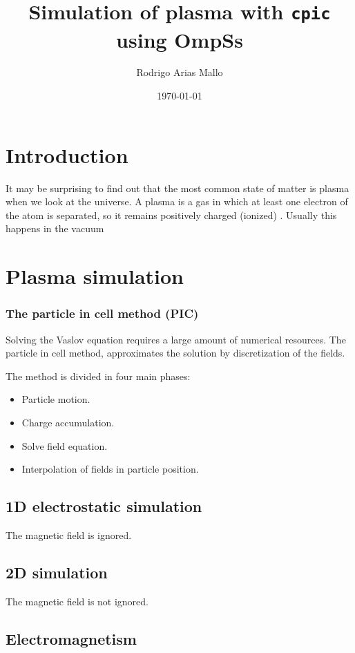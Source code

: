 \documentclass[a4paper]{report}
\title{Simulation of plasma with \texttt{cpic} using OmpSs}
\author{Rodrigo Arias Mallo}
\date{\today}
\begin{document}
\maketitle
\tableofcontents

\chapter{Introduction}

It may be surprising to find out that the most common state of matter is plasma 
when we look at the universe. A plasma is a gas in which at least one electron 
of the atom is separated, so it remains positively charged (ionized) 
\cite{chen}.  Usually this happens in the vacuum

\chapter{Plasma simulation}


\subsection{The particle in cell method (PIC)}

Solving the Vaslov equation requires a large amount of numerical resources. The 
particle in cell method, approximates the solution by discretization of the 
fields.

The method is divided in four main phases: 

\begin{itemize}
\item Particle motion.
\item Charge accumulation.
\item Solve field equation.
\item Interpolation of fields in particle position.
\end{itemize}


\section{1D electrostatic simulation}
The magnetic field is ignored.

\section{2D simulation}
The magnetic field is not ignored.

\section{Electromagnetism}
\end{document}
